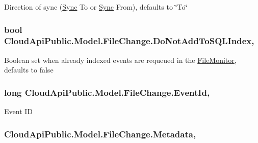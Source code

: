 Direction of sync (\hyperlink{namespace_cloud_api_public_1_1_sync}{Sync} To or \hyperlink{namespace_cloud_api_public_1_1_sync}{Sync} From), defaults to \char`\"{}\-To\char`\"{} 

\hypertarget{class_cloud_api_public_1_1_model_1_1_file_change_aa979e65ac9cd9783870afe5b25137296}{
\subsubsection[{Do\-Not\-Add\-To\-S\-Q\-L\-Index}]{\setlength{\rightskip}{0pt plus 5cm}bool Cloud\-Api\-Public.\-Model.\-File\-Change.\-Do\-Not\-Add\-To\-S\-Q\-L\-Index\hspace{0.3cm}{\ttfamily [get]}, {\ttfamily [set]}}}\label{class_cloud_api_public_1_1_model_1_1_file_change_aa979e65ac9cd9783870afe5b25137296}


Boolean set when already indexed events are requeued in the \hyperlink{namespace_cloud_api_public_1_1_file_monitor}{File\-Monitor}, defaults to false 

\hypertarget{class_cloud_api_public_1_1_model_1_1_file_change_aef22ff9ac6993f82e3612d05f093e836}{
\subsubsection[{Event\-Id}]{\setlength{\rightskip}{0pt plus 5cm}long Cloud\-Api\-Public.\-Model.\-File\-Change.\-Event\-Id\hspace{0.3cm}{\ttfamily [get]}, {\ttfamily [set]}}}\label{class_cloud_api_public_1_1_model_1_1_file_change_aef22ff9ac6993f82e3612d05f093e836}


Event I\-D 

\hypertarget{class_cloud_api_public_1_1_model_1_1_file_change_ae4e797c6b4b11f9686e4cb1318dab9a5}{
\subsubsection[{Metadata}]{ Cloud\-Api\-Public.\-Model.\-File\-Change.\-Metadata\hspace{0.3cm}{\ttfamily [get]}, {\ttfamily [set]}}}\label{class_cloud_api_public_1_1_model_1_1_file_change_ae4e797c6b4b11f9686e4cb1318dab9a5}



